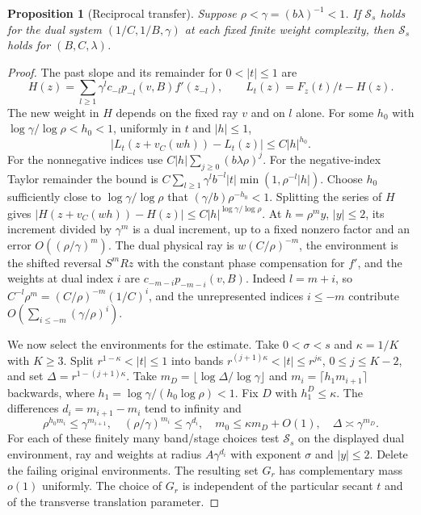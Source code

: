 \documentclass[11pt,a4paper]{article}
\newtheorem{proposition}[theorem]{Proposition}
\begin{document}
\begin{proposition}[Reciprocal transfer]\label{prop:transfer}
Suppose $\rho<\gamma=(b\lambda)^{-1}<1$. If $\mathcal S_s$ holds for the
dual system $(1/C,1/B,\gamma)$ at each fixed finite weight complexity,
then $\mathcal S_s$ holds for $(B,C,\lambda)$.
\end{proposition}
\begin{proof}
The past slope and its remainder for $0<|t|\le1$ are
\[
 H(z)=\sum_{l\ge1}\gamma^l c_{-l}p_{-l}(v,B)f'(z_{-l}),
 \qquad L_t(z)=F_z(t)/t-H(z).
\]
The new weight in $H$ depends on the fixed ray $v$ and
on $l$ alone. For some $h_0$ with
$\log\gamma/\log\rho<h_0<1$, uniformly in $t$ and $|h|\le1$,
\[
 |L_t(z+v_C(wh))-L_t(z)|\le C|h|^{h_0}.
\]
For the nonnegative indices use
$C|h|\sum_{j\ge0}(b\lambda\rho)^j$. For the negative-index Taylor
remainder the bound is
$C\sum_{l\ge1}\gamma^l b^{-l}|t|\min(1,\rho^{-l}|h|)$.
Choose $h_0$ sufficiently close to $\log\gamma/\log\rho$ that
$(\gamma/b)\rho^{-h_0}<1$. Splitting the series of $H$ gives
$|H(z+v_C(wh))-H(z)|\le C|h|^{\log\gamma/\log\rho}$.
At $h=\rho^m y$, $|y|\le2$, its increment divided by $\gamma^m$
is a dual increment, up to a fixed nonzero factor and an error
$O((\rho/\gamma)^m)$. The dual physical ray is $w(C/\rho)^{-m}$,
the environment is the shifted reversal $S^mRz$ with the constant
phase compensation for $f'$, and the weights at dual index $i$ are
$c_{-m-i}p_{-m-i}(v,B)$. Indeed $l=m+i$, so
$C^{-l}\rho^m=(C/\rho)^{-m}(1/C)^i$, and the unrepresented
indices $i\le-m$ contribute $O(\sum_{i\le-m}(\gamma/\rho)^i)$.

We now select the environments for the estimate. Take $0<\sigma<s$ and
$\kappa=1/K$ with $K\ge3$. Split $r^{1-\kappa}<|t|\le1$ into
bands $r^{(j+1)\kappa}<|t|\le r^{j\kappa}$, $0\le j\le K-2$,
and set $\Delta=r^{1-(j+1)\kappa}$. Take
$m_D=\lfloor\log\Delta/\log\gamma\rfloor$ and
$m_i=\lceil h_1m_{i+1}\rceil$ backwards, where
$h_1=\log\gamma/(h_0\log\rho)<1$. Fix $D$ with $h_1^D\le\kappa$.
The differences $d_i=m_{i+1}-m_i$ tend to infinity and
\[
 \rho^{h_0m_i}\le\gamma^{m_{i+1}},\quad
 (\rho/\gamma)^{m_i}\le\gamma^{d_i},\quad
 m_0\le\kappa m_D+O(1),\quad \Delta\asymp\gamma^{m_D}.
\]
For each of these finitely many band/stage choices test $\mathcal S_s$ on
the displayed dual environment, ray and weights at radius
$A\gamma^{d_i}$ with exponent $\sigma$ and $|y|\le2$.
Delete the failing original environments. The resulting set $G_r$
has complementary mass $o(1)$ uniformly. The choice of $G_r$ is independent of the particular
secant $t$ and of the transverse translation parameter.


\end{proof}
\end{document}
